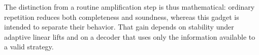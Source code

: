 The distinction from a routine amplification step is thus mathematical:
ordinary repetition reduces both completeness and soundness, whereas
this gadget is intended to separate their behavior. That gain depends
on stability under adaptive linear lifts and on a decoder that uses
only the information available to a valid strategy.
